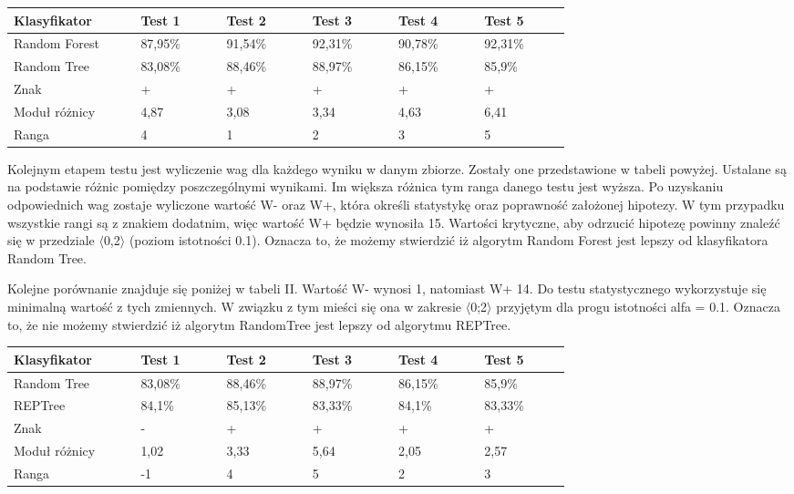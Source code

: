 \documentclass[conference]{IEEEtran}
\begin{document}
\begin{table}[H]

	\begin{tabular}{|p{0.16\linewidth}|p{0.11\linewidth}|p{0.11\linewidth}|p{0.11\linewidth}|p{0.11\linewidth}|p{0.11\linewidth}|}%
	\hline\centering
	Klasyfikator 	& Test 1 & Test 2 & Test 3 & Test 4 & Test 5 \\ \hline\centering
	Random Forest	& 87,95\% & 91,54\% & 92,31\% & 90,78\% & 92,31\% \\ \hline\centering
	Random Tree	& 83,08\% & 88,46\% & 88,97\% & 86,15\% & 85,9\% \\ \hline\centering
	Znak	& + & + & + & + & + \\ \hline\centering
	Moduł różnicy	& 4,87 & 3,08 & 3,34 & 4,63 & 6,41 \\ \hline\centering
	Ranga	& 4 & 1 & 2 & 3 & 5 \\ \hline
	\end{tabular}
\end{table}
Kolejnym etapem testu jest wyliczenie wag dla każdego wyniku w danym zbiorze. Zostały one przedstawione w tabeli powyżej. Ustalane są na podstawie różnic pomiędzy poszczególnymi wynikami. Im większa różnica tym ranga danego testu jest wyższa. Po uzyskaniu odpowiednich wag zostaje wyliczone wartość W- oraz W+, która określi statystykę oraz poprawność założonej hipotezy. W tym przypadku wszystkie rangi są z znakiem dodatnim, więc wartość W+ będzie wynosiła 15. Wartości krytyczne, aby odrzucić hipotezę powinny znaleźć się w przedziale $\langle$0,2$\rangle$ (poziom istotności 0.1). Oznacza to, że możemy stwierdzić iż algorytm Random Forest jest lepszy od klasyfikatora Random Tree. 

Kolejne porównanie znajduje się poniżej w tabeli II. Wartość W- wynosi 1, natomiast W+ 14. Do testu statystycznego wykorzystuje się minimalną wartość z tych zmiennych. W związku z tym mieści się ona w zakresie $\langle$0;2$\rangle$ przyjętym dla progu istotności alfa = 0.1. Oznacza to, że nie możemy stwierdzić iż algorytm RandomTree jest lepszy od algorytmu REPTree.  

\begin{table}[H]

	\begin{tabular}{|p{0.16\linewidth}|p{0.11\linewidth}|p{0.11\linewidth}|p{0.11\linewidth}|p{0.11\linewidth}|p{0.11\linewidth}|}%
	\hline\centering
	Klasyfikator 	& Test 1 & Test 2 & Test 3 & Test 4 & Test 5 \\ \hline\centering
	Random Tree	& 83,08\% & 88,46\% & 88,97\% & 86,15\% & 85,9\% \\ \hline\centering
	REPTree	& 84,1\% & 85,13\% & 83,33\% & 84,1\% & 83,33\% \\ \hline\centering
	Znak	& - & + & + & + & + \\ \hline\centering
	Moduł różnicy  & 1,02 & 3,33 & 5,64 & 2,05 & 2,57  \\ \hline\centering
	Ranga	& -1 & 4 & 5 & 2 & 3 \\ \hline
	\end{tabular}
\end{table} 
\end{document}
